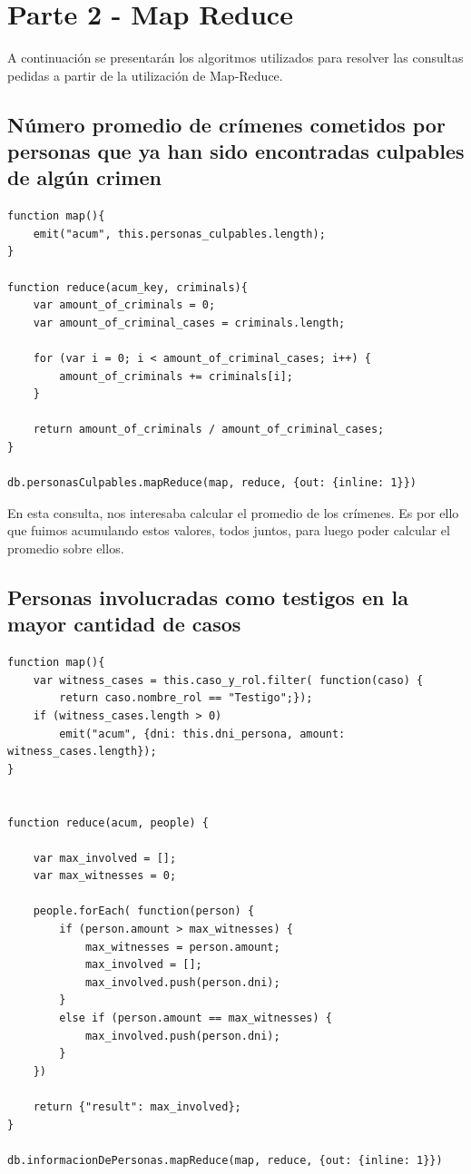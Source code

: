 \documentclass[10pt,a4paper]{article}
\begin{document}
\section{Parte 2 - Map Reduce}
A continuación se presentarán los algoritmos utilizados para resolver las consultas pedidas a partir de la utilización de Map-Reduce.

\subsection{Número promedio de crímenes cometidos por personas que ya han sido encontradas culpables de algún crimen}

\begin{lstlisting}
function map(){
	emit("acum", this.personas_culpables.length);
}

function reduce(acum_key, criminals){
	var amount_of_criminals = 0;
	var amount_of_criminal_cases = criminals.length; 
	
	for (var i = 0; i < amount_of_criminal_cases; i++) {
		amount_of_criminals += criminals[i];
	}

	return amount_of_criminals / amount_of_criminal_cases;
}

db.personasCulpables.mapReduce(map, reduce, {out: {inline: 1}})
\end{lstlisting}

En esta consulta, nos interesaba calcular el promedio de los crímenes. Es por ello que fuimos acumulando estos valores, todos juntos, para luego poder calcular el promedio sobre ellos.

\subsection{Personas involucradas como testigos en la mayor cantidad de casos}

\begin{lstlisting}
function map(){
	var witness_cases = this.caso_y_rol.filter( function(caso) {
		return caso.nombre_rol == "Testigo";});
	if (witness_cases.length > 0) 
		emit("acum", {dni: this.dni_persona, amount: witness_cases.length});
}


function reduce(acum, people) {

	var max_involved = [];
	var max_witnesses = 0;
	
	people.forEach( function(person) {
		if (person.amount > max_witnesses) {
			max_witnesses = person.amount;
			max_involved = [];
			max_involved.push(person.dni);
		}
		else if (person.amount == max_witnesses) {
			max_involved.push(person.dni);
		}
	})
	
	return {"result": max_involved};
}

db.informacionDePersonas.mapReduce(map, reduce, {out: {inline: 1}})
\end{lstlisting}
\end{document}
